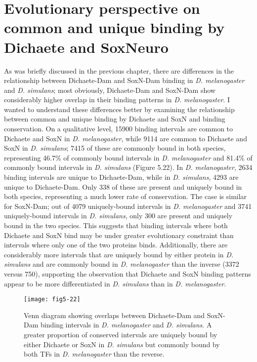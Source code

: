 \section{Evolutionary perspective on common and unique binding by Dichaete and SoxNeuro}
As was briefly discussed in the previous chapter, there are differences in the relationship between Dichaete-Dam and SoxN-Dam binding in \emph{D. melanogaster} and \emph{D. simulans}; most obviously, Dichaete-Dam and SoxN-Dam show considerably higher overlap in their binding patterns in \emph{D. melanogaster}. I wanted to understand these differences better by examining the relationship between common and unique binding by Dichaete and SoxN and binding conservation. On a qualitative level, 15900 binding intervals are common to Dichaete and SoxN in \emph{D. melanogaster}, while 9114 are common to Dichaete and SoxN in \emph{D. simulans}; 7415 of these are commonly bound in both species, representing 46.7\% of commonly bound intervals in \emph{D. melanogaster} and 81.4\% of commonly bound intervals in \emph{D. simulans} (Figure 5.22). In \emph{D. melanogaster}, 2634 binding intervals are unique to Dichaete-Dam, while in \emph{D. simulans}, 4293 are unique to Dichaete-Dam. Only 338 of these are present and uniquely bound in both species, representing a much lower rate of conservation. The case is similar for SoxN-Dam; out of 4079 uniquely-bound intervals in \emph{D. melanogaster} and 3741 uniquely-bound intervals in \emph{D. simulans}, only 300 are present and uniquely bound in the two species. This suggests that binding intervals where both Dichaete and SoxN bind may be under greater evolutionary constraint than intervals where only one of the two proteins binds. Additionally, there are considerably more intervals that are uniquely bound by either protein in \emph{D. simulans} and are commonly bound in \emph{D. melanogaster} than the inverse (3372 versus 750), supporting the observation that Dichaete and SoxN binding patterns appear to be more differentiated in \emph{D. simulans} than in \emph{D. melanogaster}.\\

\begin{figure}
\centering
\texttt{[image: fig5-22]}
\caption{Venn diagram showing overlaps between Dichaete-Dam and SoxN-Dam binding intervals in \emph{D. melanogaster} and \emph{D. simulans}. A greater proportion of conserved intervals are uniquely bound by either Dichaete or SoxN in \emph{D. simulans} but commonly bound by both TFs in \emph{D. melanogaster} than the reverse.}
\label{Figure 5.22}
\end{figure}

